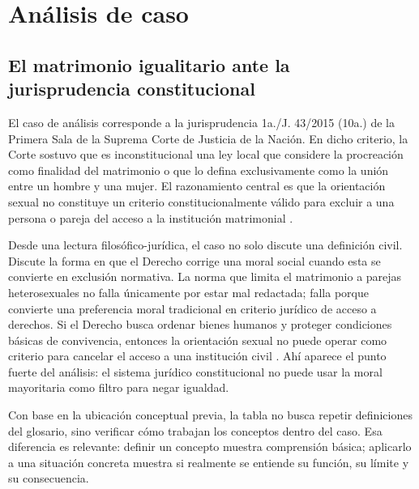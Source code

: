 \documentclass[
	spanish,
	letterpaper, oneside
]{article}
\begin{document}
\section{Análisis de caso}

\subsection{El matrimonio igualitario ante la jurisprudencia constitucional}

El caso de análisis corresponde a la jurisprudencia 1a./J. 43/2015 (10a.) de la Primera Sala de la Suprema Corte de Justicia de la Nación. En dicho criterio, la Corte sostuvo que es inconstitucional una ley local que considere la procreación como finalidad del matrimonio o que lo defina exclusivamente como la unión entre un hombre y una mujer. El razonamiento central es que la orientación sexual no constituye un criterio constitucionalmente válido para excluir a una persona o pareja del acceso a la institución matrimonial \citep{scjnMatrimonio2015}.

Desde una lectura filosófico-jurídica, el caso no solo discute una definición civil. Discute la forma en que el Derecho corrige una moral social cuando esta se convierte en exclusión normativa. La norma que limita el matrimonio a parejas heterosexuales no falla únicamente por estar mal redactada; falla porque convierte una preferencia moral tradicional en criterio jurídico de acceso a derechos. Si el Derecho busca ordenar bienes humanos y proteger condiciones básicas de convivencia, entonces la orientación sexual no puede operar como criterio para cancelar el acceso a una institución civil \citep{finnisEstudiosTeoriaDerecho2017,scjnMatrimonio2015}. Ahí aparece el punto fuerte del análisis: el sistema jurídico constitucional no puede usar la moral mayoritaria como filtro para negar igualdad.

Con base en la ubicación conceptual previa, la tabla no busca repetir definiciones del glosario, sino verificar cómo trabajan los conceptos dentro del caso. Esa diferencia es relevante: definir un concepto muestra comprensión básica; aplicarlo a una situación concreta muestra si realmente se entiende su función, su límite y su consecuencia.
\end{document}
